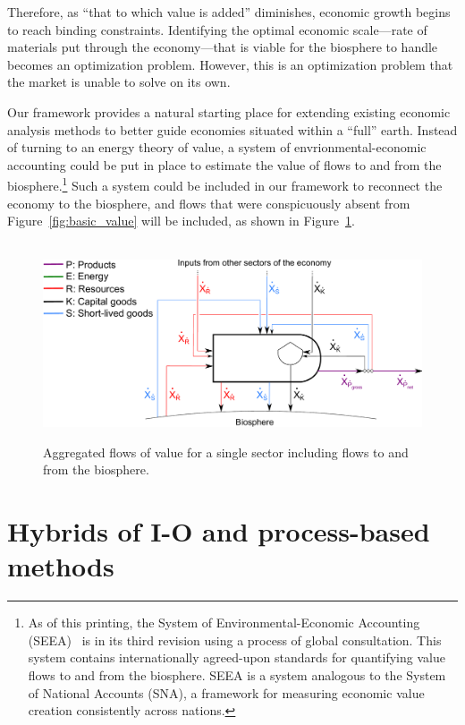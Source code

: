 Therefore, as ``that to which value is added'' diminishes, 
economic growth begins to reach binding constraints. 
Identifying the optimal economic 
scale---rate of materials put through the economy---that 
is viable for the biosphere to handle becomes an optimization problem. 
However, this is an optimization 
problem that the market is unable to solve on its own. 

Our framework provides a natural starting place for extending 
existing economic analysis methods to better
guide economies situated within a ``full'' earth. 
Instead of turning to an energy theory of value,
a system of envrionmental-economic accounting 
could be put in place to estimate the value 
of flows to and from the biosphere.\footnote{As of this printing, 
	the System of Environmental-Economic Accounting (SEEA)~\cite{UNSEEA:aa}
	is in its third revision 
	using a process of global consultation. 
	This system contains internationally agreed-upon standards for quantifying value flows 
	to and from the biosphere. 
	SEEA is a system analogous to the System of National Accounts (SNA), 
	a framework for measuring economic value creation consistently across nations.} 
Such a system could be included in our framework
to reconnect the economy to the biosphere, 
and flows that were conspicuously 
absent from Figure~\ref{fig:basic_value} will
be included, as shown in Figure~\ref{fig:basic_value_with_biosphere_flows}.

\begin{figure}[ht!]
\centering\
\includegraphics[width=0.8\linewidth]{Part_3/Chapter_Unfinished/images/PERKS_basic_unit_value_with_biosphere_flows.pdf}
\caption[Aggregated flows of value for a single sector including flows to and from the biosphere]{Aggregated flows of value for a single sector including flows to and from the biosphere.}
\label{fig:basic_value_with_biosphere_flows}
\end{figure}


\section{Hybrids of I-O and process-based methods}
\label{sec:hybrid}

